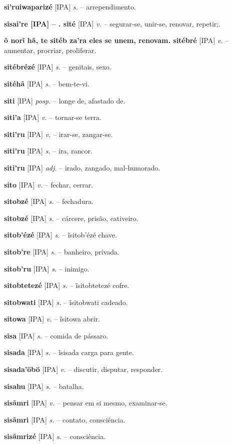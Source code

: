 \textbf{si'ruiwaparizé} [IPA] \textit{s.} -- arrependimento.

\textbf{sisai're [IPA]  -- . sité} [IPA] \textit{v.} -- segurar-se, unir-se, renovar, repetir;.

\textbf{õ norĩ hã, te sitéb za'ra eles se unem, renovam. sitébré} [IPA] \textit{v.} -- aumentar, procriar, proliferar.

\textbf{sitébrézé} [IPA] \textit{s.} -- genitais, sexo.

\textbf{sitéhã} [IPA] \textit{s.} -- bem-te-vi.

\textbf{siti} [IPA] \textit{posp.} -- longe de, afastado de.

\textbf{siti'a} [IPA] \textit{v.} -- tornar-se terra.

\textbf{siti'ru} [IPA] \textit{v.} -- irar-se, zangar-se.

\textbf{siti'ru} [IPA] \textit{s.} -- ira, rancor.

\textbf{siti'ru} [IPA] \textit{adj.} -- irado, zangado, mal-humorado.

\textbf{sito} [IPA] \textit{v.} -- fechar, cerrar.

\textbf{sitobzé} [IPA] \textit{s.} -- fechadura.

\textbf{sitobzé} [IPA] \textit{s.} -- cárcere, prisão, cativeiro.

\textbf{sitob'ézé} [IPA] \textit{s.} -- ĩsitob'ézé chave.

\textbf{sitob're} [IPA] \textit{s.} -- banheiro, privada.

\textbf{sitob'ru} [IPA] \textit{s.} -- inimigo.

\textbf{sitobtetezé} [IPA] \textit{s.} -- ĩsitobtetezé cofre.

\textbf{sitobwati} [IPA] \textit{s.} -- ĩsitobwati cadeado.

\textbf{sitowa} [IPA] \textit{v.} -- ĩsitowa abrir.

\textbf{sisa} [IPA] \textit{s.} -- comida de pássaro.

\textbf{sisada} [IPA] \textit{s.} -- ĩsisada carga para gente.

\textbf{sisada'öbö} [IPA] \textit{v.} -- discutir, disputar, responder.

\textbf{sisahu} [IPA] \textit{s.} -- batalha.

\textbf{sisãmri} [IPA] \textit{v.} -- pensar em si mesmo, examinar-se.

\textbf{sisãmri} [IPA] \textit{s.} -- contato, consciência.

\textbf{sisãmrizé} [IPA] \textit{s.} -- consciência.


